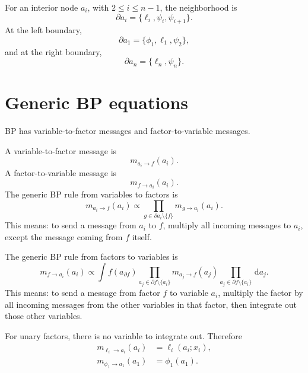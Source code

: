 \documentclass[11pt]{article}
\newcommand{\dd}{\,\mathrm{d}}
\begin{document}
For an interior node \(a_i\), with \(2\le i\le n-1\), the neighborhood is
\begin{equation}
  \partial a_i=\{\ell_i,\psi_i,\psi_{i+1}\}.
\end{equation}
At the left boundary,
\begin{equation}
  \partial a_1=\{\phi_1,\ell_1,\psi_2\},
\end{equation}
and at the right boundary,
\begin{equation}
  \partial a_n=\{\ell_n,\psi_n\}.
\end{equation}

\section{Generic BP equations}

BP has variable-to-factor messages and factor-to-variable messages.

A variable-to-factor message is
\begin{equation}
  m_{a_i\to f}(a_i).
\end{equation}
A factor-to-variable message is
\begin{equation}
  m_{f\to a_i}(a_i).
\end{equation}
The generic BP rule from variables to factors is
\begin{equation}
  m_{a_i\to f}(a_i)
  \propto
  \prod_{g\in \partial a_i\setminus\{f\}}m_{g\to a_i}(a_i).
  \label{eq:generic-v-to-f}
\end{equation}
This means: to send a message from \(a_i\) to \(f\), multiply all incoming messages to \(a_i\), except the message coming from \(f\) itself.

The generic BP rule from factors to variables is
\begin{equation}
  m_{f\to a_i}(a_i)
  \propto
  \int
  f(a_{\partial f})
  \prod_{a_j\in\partial f\setminus\{a_i\}}
  m_{a_j\to f}(a_j)
  \prod_{a_j\in\partial f\setminus\{a_i\}}\dd a_j.
  \label{eq:generic-f-to-v}
\end{equation}
This means: to send a message from factor \(f\) to variable \(a_i\), multiply the factor by all incoming messages from the other variables in that factor, then integrate out those other variables.

For unary factors, there is no variable to integrate out. Therefore
\begin{align}
  m_{\ell_i\to a_i}(a_i)&=\ell_i(a_i;x_i), \\
  m_{\phi_1\to a_1}(a_1)&=\phi_1(a_1).
\end{align}
\end{document}
